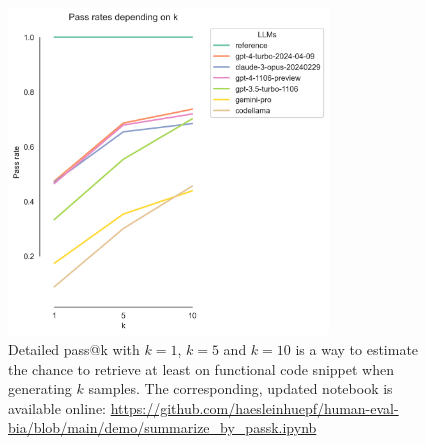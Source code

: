 \documentclass{ecai}
\begin{document}
\begin{figure}[h]
\centering
\includegraphics[width=8.5cm]{pass_k_llms_plot.png}
\caption{Detailed pass@k with $k=1$, $k=5$ and $k=10$ is a way to estimate the chance to retrieve at least on functional code snippet when generating $k$ samples. The corresponding, updated notebook is available online: 
\url{https://github.com/haesleinhuepf/human-eval-bia/blob/main/demo/summarize_by_passk.ipynb}
\newline
\newline
}
\label{fig:passk}
\end{figure}
\end{document}
